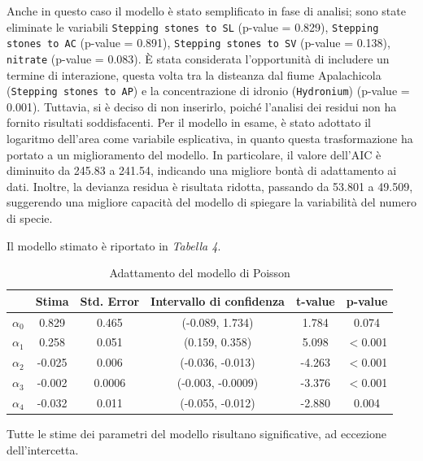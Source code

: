 \documentclass{article} %
\begin{document}
Anche in questo caso il modello è stato semplificato in fase di analisi; sono state eliminate le variabili \texttt{Stepping stones to SL} (p-value = 0.829), \texttt{Stepping stones to AC} (p-value = 0.891), \texttt{Stepping stones to SV} (p-value = 0.138), \texttt{nitrate} (p-value = 0.083).  
È stata considerata l'opportunità di includere un termine di interazione, questa volta tra la disteanza dal fiume Apalachicola (\texttt{Stepping stones to AP}) e la concentrazione di idronio (\texttt{Hydronium}) (p-value = 0.001). Tuttavia, si è deciso di non inserirlo, poiché l'analisi dei residui non ha fornito risultati soddisfacenti.
Per il modello in esame, è stato adottato il logaritmo dell'area come variabile esplicativa, in quanto questa trasformazione ha portato a un miglioramento del modello. In particolare, il valore dell'AIC è diminuito da 245.83 a 241.54, indicando una migliore bontà di adattamento ai dati. Inoltre, la devianza residua è risultata ridotta, passando da 53.801 a 49.509, suggerendo una migliore capacità del modello di spiegare la variabilità del numero di specie.

Il modello stimato è riportato in \textit{Tabella 4}.
\begin{table}[H]
    \centering
    \renewcommand{\arraystretch}{1.4} %
    \begin{tabular}{lccccc}
        \toprule
        &  Stima &  Std. Error &  Intervallo di confidenza & t-value &  p-value \\
        \midrule  
            $\alpha_0$  & 0.829  & 0.465  & (-0.089, 1.734) & 1.784 & 0.074  \\
            $\alpha_1$     & 0.258  & 0.051  & (0.159, 0.358) & 5.098 & $<$0.001 \\
            $\alpha_2$          & -0.025 & 0.006  & (-0.036, -0.013) &-4.263 & $<$0.001 \\
            $\alpha_3$          & -0.002 & 0.0006  & (-0.003, -0.0009) & -3.376 & $<$0.001 \\
            $\alpha_4$          & -0.032 & 0.011  & (-0.055, -0.012) & -2.880 & 0.004 \\
        \bottomrule
    \end{tabular}
    \caption{Adattamento del modello di Poisson}
\end{table}

Tutte le stime dei parametri del modello risultano significative, ad eccezione dell'intercetta.
\end{document}
